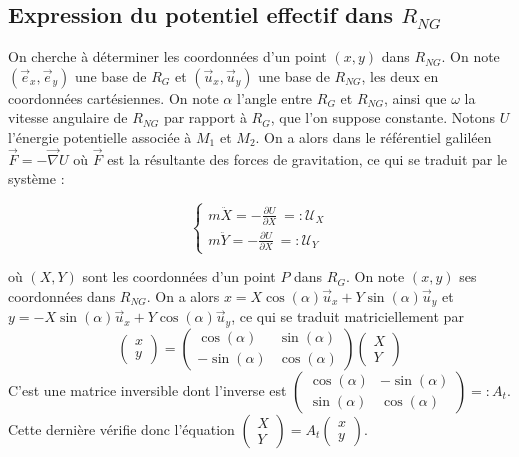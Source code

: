 \documentclass[12pt]{article}
\begin{document}
	\subsection{Expression du potentiel effectif dans $R_{NG}$}
	On cherche à déterminer les coordonnées d'un point $(x,y)$ dans $R_{NG}$. On note $(\vec{e}_x,\vec{e}_y)$ une base de $R_{G}$ et $(\vec{u}_x,\vec{u}_y)$ une base de $R_{NG}$, les deux en coordonnées cartésiennes. On note $\alpha$ l'angle entre $R_G$ et $R_{NG}$, ainsi que $\omega$ la vitesse angulaire de $R_{NG}$ par rapport à $R_G$, que l'on suppose constante. Notons $U$ l'énergie potentielle associée à $M_1$ et $M_2$. On a alors dans le référentiel galiléen $\vec{F} = -\vec{\nabla} U$ où $\vec{F}$ est la résultante des forces de gravitation, ce qui se traduit par le système :
	\begin{large}
		\begin{equation}
			\label{potential_gal}
			\begin{cases}
				m\ddot{X}=-\frac{\partial{U}}{\partial{X}} 
				\ =: \mathcal{U}_X \\
				m\ddot{Y}=-\frac{\partial{U}}{\partial{X}}
				\ =: \mathcal{U}_Y
			\end{cases}
		\end{equation}
	\end{large}
	où $(X,Y)$ sont les coordonnées d'un point $P$ dans $R_G$. On note $(x,y)$ ses coordonnées dans $R_{NG}$. On a alors $x=X\cos(\alpha)\vec{u}_x+Y\sin(\alpha)\vec{u}_y$ et $y=-X\sin(\alpha)\vec{u}_x+Y\cos(\alpha)\vec{u}_y$, ce qui se traduit matriciellement par 
	\begin{equation}
		\label{coord_change}
		\begin{pmatrix}
			x \\ y
		\end{pmatrix}
		=
		\begin{pmatrix}
			\cos(\alpha) & \sin(\alpha)
			\\
			-\sin(\alpha) & \cos(\alpha)
		\end{pmatrix}
		\begin{pmatrix}
			X \\ Y
		\end{pmatrix}
	\end{equation}
	C'est une matrice inversible dont l'inverse est 		$\begin{pmatrix}
		\cos(\alpha) & -\sin(\alpha)
		\\
		\sin(\alpha) & \cos(\alpha)
	\end{pmatrix}=:A_t$. Cette dernière vérifie donc l'équation $\begin{pmatrix}
	X\\Y
	\end{pmatrix}
	=
	A_t \begin{pmatrix}
		x\\y
	\end{pmatrix}
	$.
	
\end{document}
